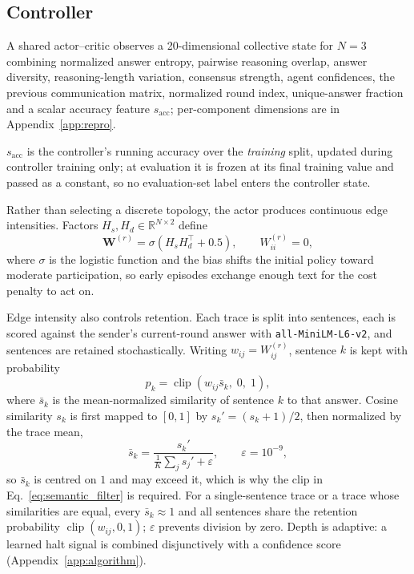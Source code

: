 \documentclass[11pt]{article}
\DeclareMathOperator*{\clip}{clip}
\begin{document}
\subsection{Controller}
\label{sec:controller}

A shared actor--critic observes a 20-dimensional collective state for $N=3$
combining normalized answer entropy, pairwise reasoning overlap, answer
diversity, reasoning-length variation, consensus strength, agent confidences, the
previous communication matrix, normalized round index, unique-answer fraction and
a scalar accuracy feature $s_{\mathrm{acc}}$; per-component dimensions are in
Appendix~\ref{app:repro}.

$s_{\mathrm{acc}}$ is the controller's running accuracy over the \emph{training}
split, updated during controller training only; at evaluation it is frozen at
its final training value and passed as a constant, so no evaluation-set label
enters the controller state.

Rather than selecting a discrete topology, the actor produces continuous edge
intensities. Factors $H_s,H_d\in\mathbb{R}^{N\times2}$ define
\begin{equation}
\mathbf{W}^{(r)}=\sigma\!\left(H_sH_d^\top+0.5\right),
\qquad W^{(r)}_{ii}=0 ,
\label{eq:weights}
\end{equation}
where $\sigma$ is the logistic function and the bias shifts the initial policy
toward moderate participation, so early episodes exchange enough text for the
cost penalty to act on.

Edge intensity also controls retention. Each trace is split into sentences, each
is scored against the sender's current-round answer with
\texttt{all-MiniLM-L6-v2}, and sentences are retained stochastically. Writing
$w_{ij}=W^{(r)}_{ij}$, sentence $k$ is kept with probability
\begin{equation}
p_k=\clip\!\left(w_{ij}\bar{s}_k,\;0,\;1\right),
\label{eq:semantic_filter}
\end{equation}
where $\bar{s}_k$ is the mean-normalized similarity of sentence $k$ to that
answer. Cosine similarity $s_k$ is first mapped to $[0,1]$ by
$s_k'=(s_k+1)/2$, then normalized by the trace mean,
\begin{equation}
\bar{s}_k=\frac{s_k'}{\tfrac{1}{K}\sum_{j}s_j'+\varepsilon},
\qquad \varepsilon=10^{-9},
\label{eq:normsim}
\end{equation}
so $\bar{s}_k$ is centred on $1$ and may exceed it, which is why the clip in
Eq.~\ref{eq:semantic_filter} is required. For a single-sentence trace or a trace
whose similarities are equal, every $\bar{s}_k\approx1$ and all sentences share
the retention probability $\clip(w_{ij},0,1)$; $\varepsilon$ prevents division
by zero. Depth is adaptive: a learned halt signal is combined disjunctively with
a confidence score (Appendix~\ref{app:algorithm}).
\end{document}
